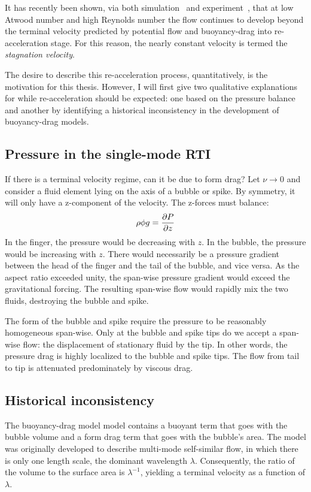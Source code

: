 It has recently been shown, via both simulation~\cite{Ramaprabhu2006} and experiment~\cite{Wilkinson2007}, that at low Atwood number and high Reynolds number the flow continues to develop beyond the terminal velocity predicted by potential flow and buoyancy-drag into re-acceleration stage.
For this reason, the nearly constant velocity is termed the \textit{stagnation velocity}.

The desire to describe this re-acceleration process, quantitatively, is the motivation for this thesis.
However, I will first give two qualitative explanations for while re-acceleration should be expected: one based on the pressure balance and another by identifying a historical inconsistency in the development of buoyancy-drag models.

\subsection{Pressure in the single-mode RTI}

If there is a terminal velocity regime, can it be due to form drag?
Let $\nu \rightarrow 0$ and consider a fluid element lying on the axis
of a bubble or spike.
By symmetry, it will only have a z-component of the velocity.
The z-forces must balance:
$$ \rho \phi g = \frac{\partial P}{\partial z} $$
In the finger, the pressure would be decreasing with $z$.
In the bubble, the pressure would be increasing with $z$.
There would necessarily be a pressure gradient between the head of the finger and the tail of the bubble, and vice versa.
As the aspect ratio exceeded unity, the span-wise pressure gradient would exceed the gravitational forcing.
The resulting span-wise flow would rapidly mix the two fluids, destroying the bubble and spike.

The form of the bubble and spike require the pressure to be reasonably homogeneous span-wise.
Only at the bubble and spike tips do we accept a span-wise flow: the displacement of stationary fluid by the tip.
In other words, the pressure drag is highly localized to the bubble and spike tips.
The flow from tail to tip is attenuated predominately by viscous drag.

\subsection{Historical inconsistency}

The buoyancy-drag model model contains a buoyant term that goes with the bubble volume and a form drag term that goes with the bubble's area.
The model was originally developed to describe multi-mode self-similar flow, in which there is only one length scale, the dominant wavelength $\lambda$.
Consequently, the ratio of the volume to the surface area is $\lambda^{-1}$, yielding a terminal velocity as a function of $\lambda$.

